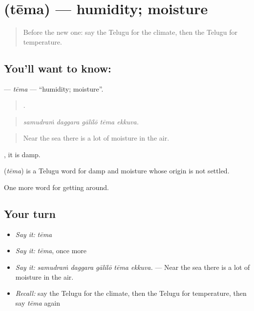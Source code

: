 \section[\texorpdfstring{\te{తేమ} (tēma)}{తేమ (tēma)}]{ (tēma) — humidity; moisture}

\label{lesson:TE-C476-tema}



\begin{quote}
Before the new one: say the Telugu for the climate, then the Telugu for temperature.
\end{quote}

\subsection*{You'll want to know: }
\textbf{} — \emph{tēma} — \textquotedblleft{}humidity; moisture\textquotedblright{}.

\begin{quote}
    .
\end{quote}

\begin{quote}
\emph{samudraṁ daggara gālilō tēma ekkuva.}
\end{quote}

\begin{quote}
Near the sea there is a lot of moisture in the air.
\end{quote}

 , it is damp.

\begin{cousinweb}
\textbf{} (\emph{tēma}) is a Telugu word for damp and moisture whose origin is not settled.
\end{cousinweb}

\begin{grammarlens}[title={What you've built}]
One more word for getting around.
\end{grammarlens}

\subsection*{Your turn}
\begin{itemize}
\raggedright
  \item \emph{Say it:} \emph{tēma}
  \item \emph{Say it:} \emph{tēma}, once more
  \item \emph{Say it:} \emph{samudraṁ daggara gālilō tēma ekkuva.} — Near the sea there is a lot of moisture in the air.
  \item \emph{Recall:} say the Telugu for the climate, then the Telugu for temperature, then say \emph{tēma} again
\end{itemize}

